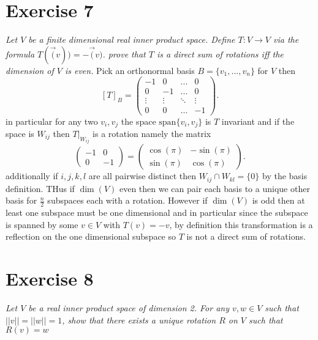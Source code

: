 \documentclass{article}
\begin{document}
    \section{Exercise 7}
    \emph{
        Let $V$ be a finite dimensional real inner product space. Define $T : V \rightarrow V$ via the
        formula $T(\vec(v)) = -\vec(v)$. prove that $T$ is a direct sum of rotations iff the dimension of $V$ is even.
    }
    Pick an orthonormal basis $B = \{v_1,...,v_n\}$ for $V$ then
    \[
        [T]_B = \begin{pmatrix} 
            -1 & 0 & ... & 0\\
            0 & -1 & ... & 0\\
            \vdots & \vdots & \ddots & \vdots\\
            0 & 0 & ... & -1
        \end{pmatrix} 
    .\] 
    in particular for any two $v_i, v_j$ the space $\text{span}\{v_i,v_j\}$ is $T$ invariant and if the space is $W_{ij}$ then
    $T|_{W_{ij}}$ is a rotation namely the matrix 
    \[
        \begin{pmatrix} 
            -1 & 0\\
            0 & -1
        \end{pmatrix} =
        \begin{pmatrix} 
            \cos(\pi) & -\sin(\pi)\\
            \sin(\pi) & \cos(\pi)
        \end{pmatrix} 
    .\] 
    additionally if $i,j,k,l$ are all pairwise distinct then $W_{ij} \cap W_{kl} = \{0\}$ by the basis definition.
    THus if $\dim(V)$ even then we can pair each basis to a unique other basis for  $\frac{n}{2}$ subspaces each with a rotation. However if $\dim(V)$
    is odd then at least one subspace must be one dimensional and in particular since the subspace is spanned by some $v \in V$ with $T(v) = -v$, by definition this transformation
    is a reflection on the one dimensional subspace so $T$ is not a direct sum of rotations.

    \section{Exercise 8}
    \emph{
        Let $V$ be a real inner product space of dimension 2. For any $v,w \in V$ such that 
        $||v|| = ||w|| = 1$, show that there exists a unique rotation $R$ on $V$ such that $R(v) = w$
    }
\end{document}
